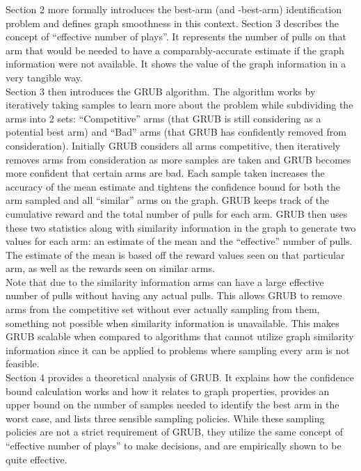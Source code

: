 \documentclass{article}[12pt]
\begin{document}
Section 2 more formally introduces the best-arm (and -best-arm) identification problem and defines graph smoothness in this context.
Section 3 describes the concept of “effective number of plays”.
It represents the number of pulls on that arm that would be needed to have a comparably-accurate estimate if the graph information were not available.
It shows the value of the graph information in a very tangible way. \\

Section 3 then introduces the GRUB algorithm.
The algorithm works by iteratively taking samples to learn more about the problem while subdividing the arms into 2 sets:
“Competitive” arms (that GRUB is still considering as a potential best arm) and “Bad” arms (that GRUB has confidently removed from consideration).
Initially GRUB considers all arms competitive, then iteratively removes arms from consideration as more samples are taken and GRUB becomes more confident that certain arms are bad.
Each sample taken increases the accuracy of the mean estimate and tightens the confidence bound for both the arm sampled and all “similar” arms on the graph.
GRUB keeps track of the cumulative reward and the total number of pulls for each arm.
GRUB then uses these two statistics along with similarity information in the graph to generate two values for each arm: an estimate of the mean and the “effective” number of pulls.
The estimate of the mean is based off the reward values seen on that particular arm, as well as the rewards seen on similar arms. \\

Note that due to the similarity information arms can have a large effective number of pulls without having any actual pulls.
This allows GRUB to remove arms from the competitive set without ever actually sampling from them, something not possible when similarity information is unavailable.
This makes GRUB scalable when compared to algorithms that cannot utilize graph similarity information since it can be applied to problems where sampling every arm is not feasible. \\

Section 4 provides a theoretical analysis of GRUB.
It explains how the confidence bound calculation works and how it relates to graph properties,
provides an upper bound on the number of samples needed to identify the best arm in the worst case,
and lists three sensible sampling policies.
While these sampling policies are not a strict requirement of GRUB,
they utilize the same concept of “effective number of plays” to make decisions,
and are empirically shown to be quite effective. \\
\end{document}
